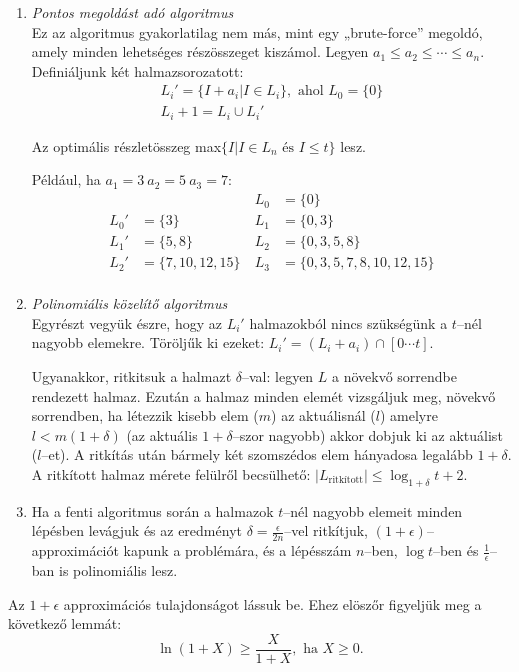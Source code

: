 \begin{enumerate}
  \item \emph{Pontos megoldást adó algoritmus}\\
Ez az algoritmus gyakorlatilag nem más, mint egy „brute-force” megoldó, amely
minden lehetséges részösszeget kiszámol. Legyen $a_1 \leq a_2 \leq \cdots \leq
a_n$. Definiáljunk két halmazsorozatott:
\begin{align*}
L_i' = \{ I + a_i | I \in L_i\}, \mbox{ ahol } L_0 = \{ 0\} \\
L_i+1=L_i \cup L_i'
\end{align*} 

Az optimális részletösszeg max$\{I|I \in L_n \mbox{ és } I \leq t\}$ lesz.

Például, ha $a_1=3~a_2=5~a_3=7$:
{ 
\begin{align*}
    &&~L_0 &= \{ 0 \} \\
L_0'&= \{ 3 \} &~ L_1 &= \{ 0, 3\} \\
L_1'&= \{ 5,8 \} &~ L_2 &= \{ 0, 3, 5, 8\} \\
L_2'&= \{ 7, 10, 12, 15 \} &~ L_3 &= \{ 0, 3, 5, 7, 8, 10, 12, 15\} \\
\end{align*}}  
  \item \emph{Polinomiális közelítő algoritmus} \\
  Egyrészt vegyük észre, hogy az $L_i'$ halmazokból nincs szükségünk a $t$--nél
  nagyobb elemekre. Töröljűk ki ezeket: $L_i' = (L_i+a_i) \cap [0 \cdots t]$.
  
  Ugyanakkor, ritkitsuk a halmazt $\delta$--val: legyen $L$ a növekvő sorrendbe
  rendezett halmaz. Ezután a halmaz minden elemét vizsgáljuk meg, növekvő
  sorrendben, ha létezzik kisebb elem ($m$) az aktuálisnál ($l$) amelyre
  $l<m(1+\delta)$ (az aktuális $1+\delta$--szor nagyobb) akkor dobjuk ki az
  aktuálist ($l$--et). A ritkítás után bármely két szomszédos elem hányadosa
  legalább $1+\delta$. A ritkított halmaz mérete felülről becsülhető:
  $|L_{\mbox{ritkított}}| \leq \log_{1+\delta}{t+2}$.
  \item Ha a fenti algoritmus során a halmazok $t$--nél nagyobb elemeit minden
  lépésben levágjuk és az eredményt $\delta = \frac{\epsilon}{2n}$--vel
  ritkítjuk, $(1+\epsilon)$--approximációt kapunk a problémára, és a lépésszám
  $n$--ben, $\log t$--ben és $\frac{1}{\epsilon}$--ban is polinomiális lesz.
\end{enumerate}

Az $1+\epsilon$ approximációs tulajdonságot lássuk be. Ehez elöszőr figyeljük
meg a következő lemmát:
\[ \ln{(1+X)} \geq \frac{X}{1+X}, \mbox{ ha } X \geq 0.\]

